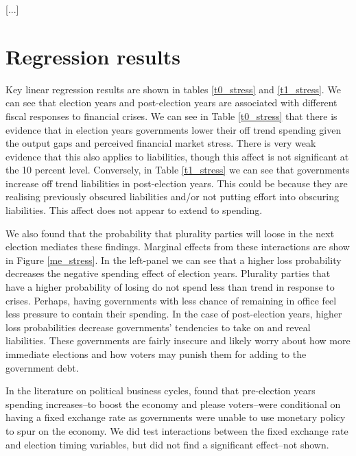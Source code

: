 \documentclass[]{article}
\begin{document}
[...]

\section{Regression results}

Key linear regression results are shown in tables \ref{t0_stress} and \ref{t1_stress}. We can see that election years and post-election years are associated with different fiscal responses to financial crises. We can see in Table \ref{t0_stress} that there is evidence that in election years governments lower their off trend spending given the output gaps and perceived financial market stress. There is very weak evidence that this also applies to liabilities, though this affect is not significant at the 10 percent level. Conversely, in Table \ref{t1_stress} we can see that governments increase off trend liabilities in post-election years. This could be because they are realising previously obscured liabilities and/or not putting effort into obscuring liabilities. This affect does not appear to extend to spending.

We also found that the probability that plurality parties will loose in the next election mediates these findings. Marginal effects from these interactions are show in Figure \ref{me_stress}. In the left-panel we can see that a higher loss probability decreases the negative spending effect of election years. Plurality parties that have a higher probability of losing do not spend less than trend in response to crises. Perhaps, having governments with less chance of remaining in office feel less pressure to contain their spending. In the case of post-election years, higher loss probabilities decrease governments' tendencies to take on and reveal liabilities. These governments are fairly insecure and likely worry about how more immediate elections and how voters may punish them for adding to the government debt.

In the literature on political business cycles, \cite{clark2000} found that pre-election years spending increases--to boost the economy and please voters--were conditional on having a fixed exchange rate as governments were unable to use monetary policy to spur on the economy. We did test interactions between the fixed exchange rate and election timing variables, but did not find a significant effect--not shown. 
\end{document}
